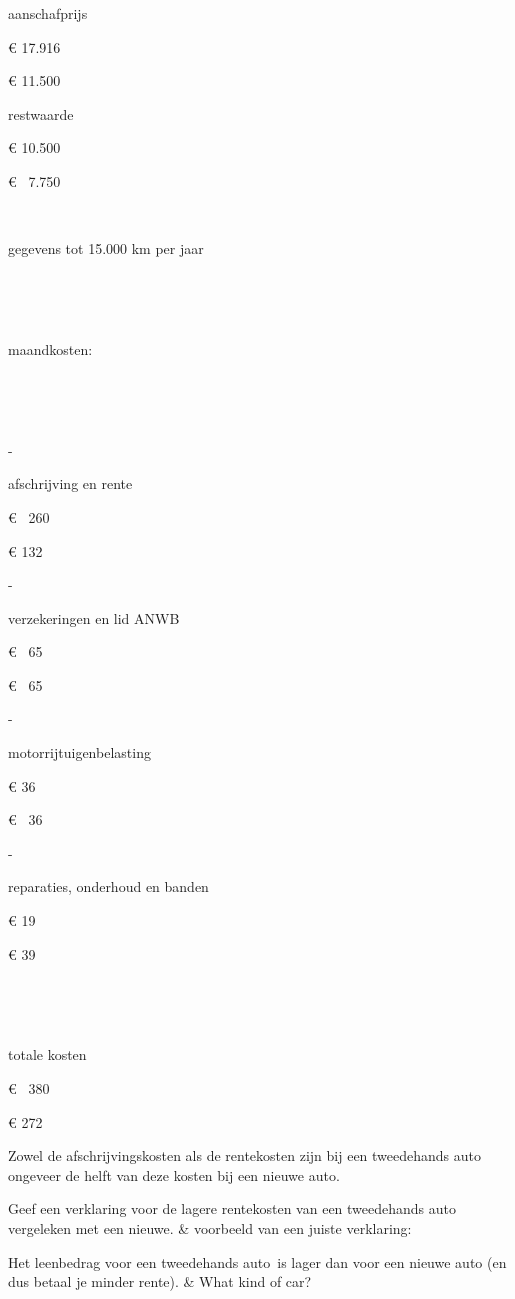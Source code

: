 \begin{longtable}[t]
 

 aanschafprijs 

 € 17.916 

 € 11.500 

 restwaarde 

 € 10.500 

 €    7.750 

 

  

   

 gegevens tot 15.000 km per jaar 

   

   

 maandkosten: 

   

   

 - 

                     afschrijving en rente 

€         260 

€         132 

 -

                      verzekeringen en lid ANWB 

 €          65 

€           65 

 -

                      motorrijtuigenbelasting 

 €          36 

 €          36 

 -

                      reparaties, onderhoud en banden 

€           19 

 €          39 

 

   

   

 totale kosten 

 €         380 

€          272 

  

 Zowel de afschrijvingskosten als de rentekosten zijn bij een tweedehands auto ongeveer de helft van deze kosten bij een nieuwe auto. 

 Geef een verklaring voor de lagere rentekosten van een tweedehands auto vergeleken met een nieuwe. & voorbeeld van een juiste verklaring: 

 Het leenbedrag voor een tweedehands auto is lager dan voor een nieuwe auto (en dus betaal je minder rente). & What kind of car?






\end{longtable}
